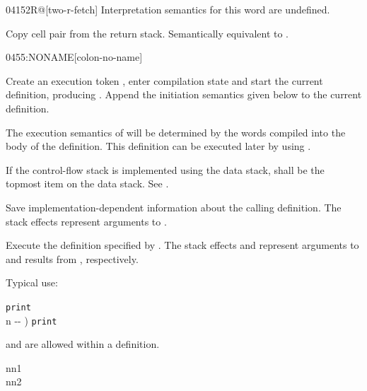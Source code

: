 \begin{worddef}{0415}{2R@}[two-r-fetch]
\interpret
	Interpretation semantics for this word are undefined.

\execute

	Copy cell pair  from the return stack.
	Semantically equivalent to   
	  .

\end{worddef}


\begin{worddef}{0455}{:NONAME}[colon-no-name]
\item {}

	Create an execution token , enter compilation state
	and start the current definition, producing .
	Append the initiation semantics given below to the current
	definition.

	The execution semantics of  will be determined by the
	words compiled into the body of the definition. This definition
	can be executed later by using  .

	If the control-flow stack is implemented using the data stack,
	 shall be the topmost item on the data stack.
	See .

\init

	Save implementation-dependent information 
	about the calling definition. The stack effects 
	represent arguments to .

\execute[xt]

	Execute the definition specified by . The stack
	effects  and  represent arguments to
	and results from , respectively.

	\begin{rationale} %
		Typical use:

		\tab {} \texttt{print} \\[2ex]
		\tab {}  n -{}- )  \word{;}  \texttt{print}

	\note {} and  are allowed within a  definition.
	\end{rationale}

	\begin{testing} %
	 nn1 \\
	 nn2 \\
	 \\
	 \\
	 \\
	\end{testing}
\end{worddef}


